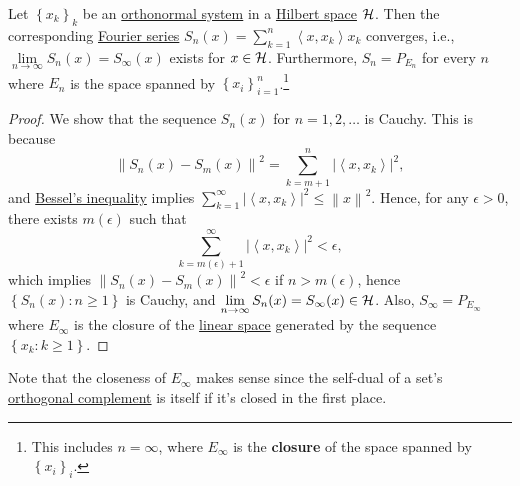 \begin{theorem}
	Let \(\left\{ x_{k}\right\}_{k} \) be an \hyperref[def:orthonormal-system]{orthonormal system} in a \hyperref[def:Hilbert-space]{Hilbert space} \(\mathcal{\MakeUppercase{h}} \). Then the corresponding \hyperref[def:Fourier-series]{Fourier series} \(S_n(x) = \sum_{k=1}^{n} \left\langle  x, x_{k} \right\rangle  x_{k}\) converges, i.e., \(\lim\limits_{n \to \infty} S_{n} (x) = S_{\infty }(x)\) exists for \(x\in \mathcal{\MakeUppercase{h}} \). Furthermore, \(S_n = P_{E_n}\) for every \(n\) where \(E_n\) is the space spanned by \(\left\{ x_i \right\} _{i=1}^n\).\footnote{This includes \(n=\infty\), where \(E_\infty \) is the \textbf{closure} of the space spanned by \(\left\{ x_i \right\}_i\).}
\end{theorem}
\begin{proof}
	We show that the sequence \(S_n(x)\) for \(n = 1, 2, \ldots\) is Cauchy. This is because
	\[
		\left\lVert S_n(x) - S_m(x)\right\rVert ^{2} = \sum_{k=m+1}^{n} \left\vert \left\langle x, x_{k}\right\rangle  \right\vert ^{2},
	\]
	and \hyperref[thm:Bessel-ineq]{Bessel's inequality} implies \(\sum_{k=1}^{\infty} \left\vert \left\langle x, x_{k}  \right\rangle  \right\vert ^{2} \leq \left\lVert x\right\rVert ^{2} \). Hence, for any \(\epsilon > 0\), there exists \(m(\epsilon )\) such that
	\[
		\sum_{k=m(\epsilon )+1}^{\infty} \left\vert \left\langle x, x_{k}  \right\rangle  \right\vert ^{2} < \epsilon,
	\]
	which implies \(\left\lVert S_n(x) - S_m(x)\right\rVert ^{2} < \epsilon \) if \(n > m(\epsilon )\), hence \(\left\{ S_{n} (x)\colon n\geq 1 \right\}\) is Cauchy, and \(\lim\limits_{n \to \infty} S_n(x)= S_\infty (x)\in \mathcal{\MakeUppercase{h}} \). Also, \(S_\infty = P_{E_\infty }\) where \(E_\infty \) is the closure of the \hyperref[def:linear-vector-space]{linear space} generated by the sequence \(\left\{ x_{k} \colon k \geq 1 \right\} \).
\end{proof}

\begin{remark}
	Note that the closeness of \(E_\infty \) makes sense since the self-dual of a set's \hyperref[def:orthogonal-complement]{orthogonal complement} is itself if it's closed in the first place.
\end{remark}